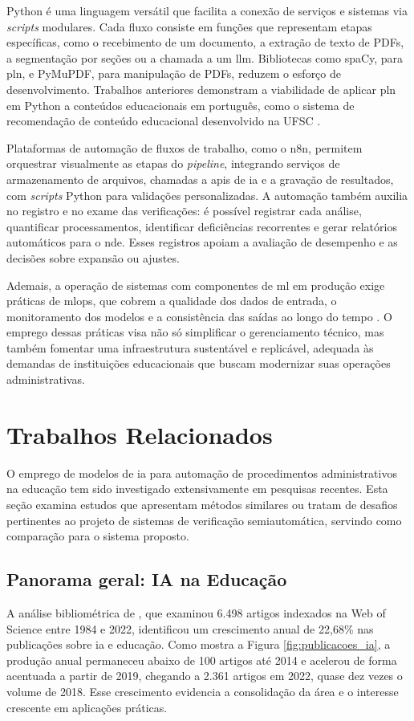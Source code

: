 Python é uma linguagem versátil que facilita a conexão de serviços e sistemas via \textit{scripts} modulares. Cada fluxo consiste em funções que representam etapas específicas, como o recebimento de um documento, a extração de texto de PDFs, a segmentação por seções ou a chamada a um \gls{llm}. Bibliotecas como spaCy, para \gls{pln}, e PyMuPDF, para manipulação de PDFs, reduzem o esforço de desenvolvimento. Trabalhos anteriores demonstram a viabilidade de aplicar \gls{pln} em Python a conteúdos educacionais em português, como o sistema de recomendação de conteúdo educacional desenvolvido na UFSC \cite{VieiraFilho2024}.

Plataformas de automação de fluxos de trabalho, como o n8n, permitem orquestrar visualmente as etapas do \textit{pipeline}, integrando serviços de armazenamento de arquivos, chamadas a \glspl{api} de \gls{ia} e a gravação de resultados, com \textit{scripts} Python para validações personalizadas. A automação também auxilia no registro e no exame das verificações: é possível registrar cada análise, quantificar processamentos, identificar deficiências recorrentes e gerar relatórios automáticos para o \gls{nde}. Esses registros apoiam a avaliação de desempenho e as decisões sobre expansão ou ajustes.

Ademais, a operação de sistemas com componentes de \gls{ml} em produção exige práticas de \gls{mlops}, que cobrem a qualidade dos dados de entrada, o monitoramento dos modelos e a consistência das saídas ao longo do tempo \cite{Kreuzberger2023}. O emprego dessas práticas visa não só simplificar o gerenciamento técnico, mas também fomentar uma infraestrutura sustentável e replicável, adequada às demandas de instituições educacionais que buscam modernizar suas operações administrativas.

\section{Trabalhos Relacionados}
O emprego de modelos de \gls{ia} para automação de procedimentos administrativos na educação tem sido investigado extensivamente em pesquisas recentes. Esta seção examina estudos que apresentam métodos similares ou tratam de desafios pertinentes ao projeto de sistemas de verificação semiautomática, servindo como comparação para o sistema proposto.

\subsection{Panorama geral: IA na Educação}
A análise bibliométrica de , que examinou 6.498 artigos indexados na Web of Science entre 1984 e 2022, identificou um crescimento anual de 22,68\% nas publicações sobre \gls{ia} e educação. Como mostra a Figura \ref{fig:publicacoes_ia}, a produção anual permaneceu abaixo de 100 artigos até 2014 e acelerou de forma acentuada a partir de 2019, chegando a 2.361 artigos em 2022, quase dez vezes o volume de 2018. Esse crescimento evidencia a consolidação da área e o interesse crescente em aplicações práticas.


